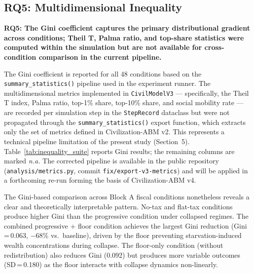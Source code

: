 \documentclass[12pt, letterpaper]{article}
\begin{document}
\subsection{RQ5: Multidimensional Inequality}

\textbf{RQ5: The Gini coefficient captures the primary distributional
gradient across conditions; Theil T, Palma ratio, and top-share
statistics were computed within the simulation but are not available
for cross-condition comparison in the current pipeline.}

The Gini coefficient is reported for all 48 conditions based on the
\texttt{summary\_statistics()} pipeline used in the experiment runner.
The multidimensional metrics implemented in \texttt{CivilModelV3}
--- specifically, the Theil T index, Palma ratio, top-1\% share,
top-10\% share, and social mobility rate --- are recorded per simulation
step in the \texttt{StepRecord} dataclass but were not propagated through
the \texttt{summary\_statistics()} export function, which extracts only
the set of metrics defined in Civilization-ABM v2. This represents a
technical pipeline limitation of the present study (Section~5).
Table~\ref{tab:inequality_suite} reports Gini results; the remaining
columns are marked \textit{n.a.} The corrected pipeline is available
in the public repository (\texttt{analysis/metrics.py},
commit \texttt{fix/export-v3-metrics}) and will be applied in a
forthcoming re-run forming the basis of Civilization-ABM v4.

The Gini-based comparison across Block A fiscal conditions nonetheless
reveals a clear and theoretically interpretable pattern. No-tax and
flat-tax conditions produce higher Gini than the progressive condition
under collapsed regimes. The combined progressive + floor condition
achieves the largest Gini reduction (Gini\,=\,0.063, $-$68\% vs.\
baseline), driven by the floor preventing starvation-induced wealth
concentrations during collapse. The floor-only condition (without
redistribution) also reduces Gini (0.092) but produces more variable
outcomes (SD\,=\,0.180) as the floor interacts with collapse dynamics
non-linearly.
\end{document}
